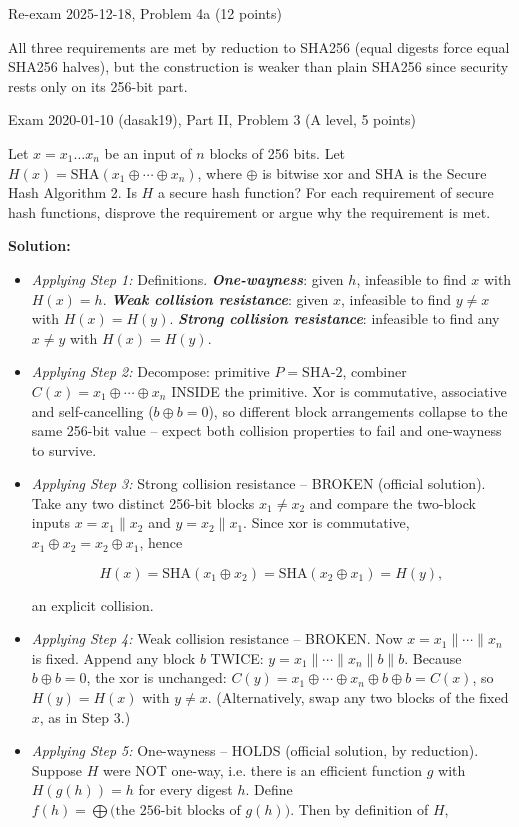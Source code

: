 \documentclass[12pt, a4paper]{article}
\newcommand{\term}[1]{\textbf{\textit{#1}}}        %
\begin{document}
\begin{practicebox}{Re-exam 2025-12-18, Problem 4a (12 points)}
\begin{answerbox}
All three requirements are met by reduction to SHA256 (equal digests force equal SHA256 halves), but the construction is weaker than plain SHA256 since security rests only on its 256-bit part.
\end{answerbox}
\end{practicebox}

\begin{practicebox}{Exam 2020-01-10 (dasak19), Part II, Problem 3 (A level, 5 points)}
\begin{problembox}
Let $x = x_1 \dots x_n$ be an input of $n$ blocks of 256 bits. Let $H(x) = \mathrm{SHA}(x_1 \oplus \cdots \oplus x_n)$, where $\oplus$ is bitwise xor and SHA is the Secure Hash Algorithm 2. Is $H$ a secure hash function? For each requirement of secure hash functions, disprove the requirement or argue why the requirement is met.
\end{problembox}

\textbf{Solution:}
\begin{itemize}
    \item \textit{Applying Step 1:} Definitions. \term{One-wayness}: given $h$, infeasible to find $x$ with $H(x) = h$. \term{Weak collision resistance}: given $x$, infeasible to find $y \neq x$ with $H(x) = H(y)$. \term{Strong collision resistance}: infeasible to find any $x \neq y$ with $H(x) = H(y)$.
    \item \textit{Applying Step 2:} Decompose: primitive $P = \mathrm{SHA\text{-}2}$, combiner $C(x) = x_1 \oplus \cdots \oplus x_n$ INSIDE the primitive. Xor is commutative, associative and self-cancelling ($b \oplus b = 0$), so different block arrangements collapse to the same 256-bit value -- expect both collision properties to fail and one-wayness to survive.
    \item \textit{Applying Step 3:} Strong collision resistance -- BROKEN (official solution). Take any two distinct 256-bit blocks $x_1 \neq x_2$ and compare the two-block inputs $x = x_1 \| x_2$ and $y = x_2 \| x_1$. Since xor is commutative, $x_1 \oplus x_2 = x_2 \oplus x_1$, hence

\[
H(x) = \mathrm{SHA}(x_1 \oplus x_2) = \mathrm{SHA}(x_2 \oplus x_1) = H(y),
\]

an explicit collision.
    \item \textit{Applying Step 4:} Weak collision resistance -- BROKEN. Now $x = x_1 \| \cdots \| x_n$ is fixed. Append any block $b$ TWICE: $y = x_1 \| \cdots \| x_n \| b \| b$.
    Because $b \oplus b = 0$, the xor is unchanged: $C(y) = x_1 \oplus \cdots \oplus x_n \oplus b \oplus b = C(x)$, so $H(y) = H(x)$ with $y \neq x$. (Alternatively, swap any two blocks of the fixed $x$, as in Step 3.)
    \item \textit{Applying Step 5:} One-wayness -- HOLDS (official solution, by reduction). Suppose $H$ were NOT one-way, i.e. there is an efficient function $g$ with $H(g(h)) = h$ for every digest $h$. Define $f(h) = \bigoplus \text{(the 256-bit blocks of } g(h) \text{)}$. Then by definition of $H$,


\end{itemize}
\end{practicebox}
\end{document}
